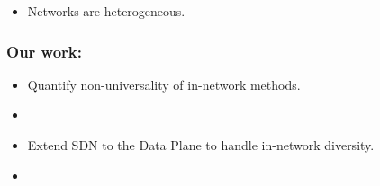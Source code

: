 \begin{Large}
\begin{frame}[plain]
\begin{itemize}
\item{Networks are heterogeneous.}

\end{itemize}
\end{frame}

\begin{frame}[plain]
\frametitle{Our work:}
\begin{itemize}
\item{Quantify non-universality of in-network methods.}
\item[]

\item{Extend SDN to the Data Plane to handle in-network diversity.}
\item[]

\end{itemize}
\end{frame}


\end{Large}

